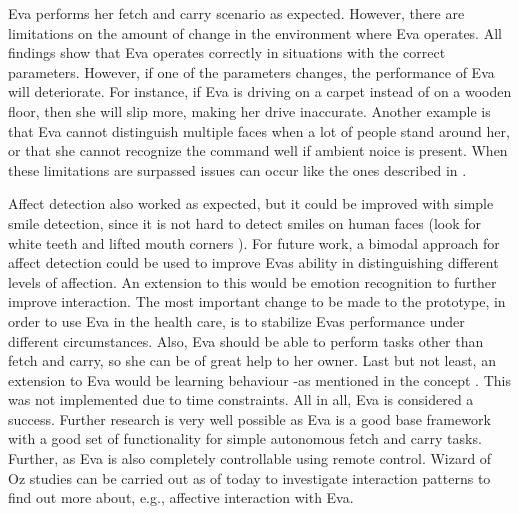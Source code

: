 \documentclass[project_eva.tex]{subfiles}
\begin{document}
Eva performs her fetch and carry scenario as expected. However, there are limitations on the amount of change in the 
environment where Eva operates. All findings show that Eva operates correctly in situations with the correct 
parameters. However, if one of the parameters changes, the performance of Eva will deteriorate. For instance, if Eva is 
driving on a carpet instead of on a wooden floor, then she will slip more, making her drive inaccurate. Another example 
is that Eva cannot distinguish multiple faces when a lot of people stand around her, or that she cannot recognize the 
command well if ambient noice is present. When these limitations are surpassed issues can occur like the ones described 
in \pageref{simulation} .

Affect detection also worked as expected, but it could be improved with simple smile detection, since it is not hard to 
detect smiles on human faces (look for white teeth and lifted mouth corners \cite{autosmiley} \cite{smile} ). For future work, a bimodal approach \cite{bimodal} for affect detection could be used to improve Eva\textquotesingle s ability in 
distinguishing different levels of affection. An extension to this would be emotion recognition to further improve 
interaction. The most important change to be made to the prototype, in order to use Eva in the health care, is to stabilize Eva\textquotesingle s performance under different circumstances. Also, Eva should be able to perform tasks other than fetch and carry, so she can be of great help to her owner. Last but not least, an extension to Eva would be learning behaviour -as mentioned in the concept \pageref{concept} . This was not implemented due to time constraints. All in all, Eva is considered a success. Further research is very well possible as Eva is a good base framework with a good set of functionality for simple autonomous fetch and carry tasks. Further, as Eva is also completely controllable using remote control. Wizard of Oz studies can be carried out as of today to investigate interaction patterns to find out more about, e.g., affective interaction with Eva. 
\end{document}
